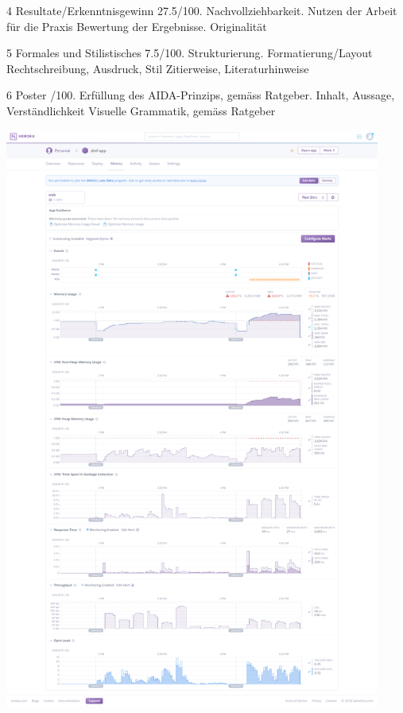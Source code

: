 \documentclass{ffhsthesis}
\begin{document}
4 Resultate/Erkenntnisgewinn 27.5/100. Nachvollziehbarkeit. Nutzen der Arbeit für die Praxis Bewertung der Ergebnisse. Originalität\newline

5 Formales und Stilistisches 7.5/100. Strukturierung. Formatierung/Layout Rechtschreibung, Ausdruck, Stil Zitierweise, Literaturhinweise\newline

6 Poster /100. Erfüllung des AIDA-Prinzips, gemäss Ratgeber. Inhalt, Aussage, Verständlichkeit Visuelle Grammatik, gemäss Ratgeber\newline



\includegraphics[width=350pt ]{anhang/screencapture-dashboard-heroku-apps-dinf-app-metrics-web-1517153971214.png}\newline
\end{document}
